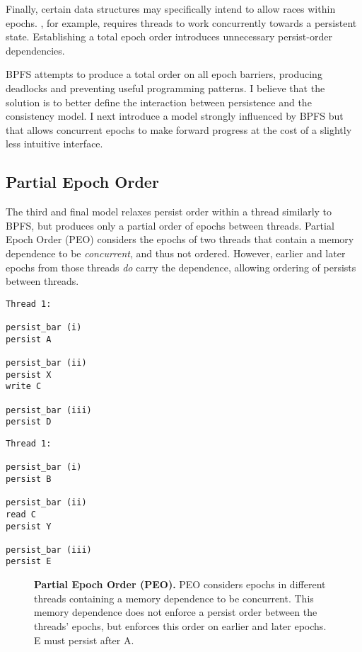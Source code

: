 Finally, certain data structures may specifically intend to allow races within epochs.
\GroupCommit, for example, requires threads to work concurrently towards a persistent state.
Establishing a total epoch order introduces unnecessary persist-order dependencies.

BPFS attempts to produce a total order on all epoch barriers, producing deadlocks and preventing useful programming patterns.
I believe that the solution is to better define the interaction between persistence and the consistency model.
I next introduce a model strongly influenced by BPFS but that allows concurrent epochs to make forward progress at the cost of a slightly less intuitive interface.

\subsection{Partial Epoch Order}
\label{sec:PMC:PersistenceModels:PEO}

The third and final model relaxes persist order within a thread similarly to BPFS, but produces only a partial order of epochs between threads.
Partial Epoch Order (PEO) considers the epochs of two threads that contain a memory dependence to be \emph{concurrent}, and thus not ordered.
However, earlier and later epochs from those threads \emph{do} carry the dependence, allowing ordering of persists between threads.

{
\singlespacing
\newsavebox{\PEOThreadOne}
\begin{lrbox}{\PEOThreadOne}
  \begin{lstlisting}
Thread 1:

persist_bar (i)
persist A

persist_bar (ii)
persist X
write C

persist_bar (iii)
persist D
  \end{lstlisting}
\end{lrbox}

\newsavebox{\PEOThreadTwo}
\begin{lrbox}{\PEOThreadTwo}
  \begin{lstlisting}
Thread 1:

persist_bar (i)
persist B

persist_bar (ii)
read C
persist Y

persist_bar (iii)
persist E
  \end{lstlisting}
\end{lrbox}

\begin{figure}[]
\centering
\subfigure{ \usebox{\PEOThreadOne} }
\hspace{1 in}
\subfigure{ \usebox{\PEOThreadTwo} }
\caption{\textbf{Partial Epoch Order (PEO).} PEO considers epochs in different threads containing a memory dependence to be concurrent.  This memory dependence does not enforce a persist order between the threads' epochs, but enforces this order on earlier and later epochs.  E must persist after A.}
\label{fig:PEO}
\end{figure}
}

